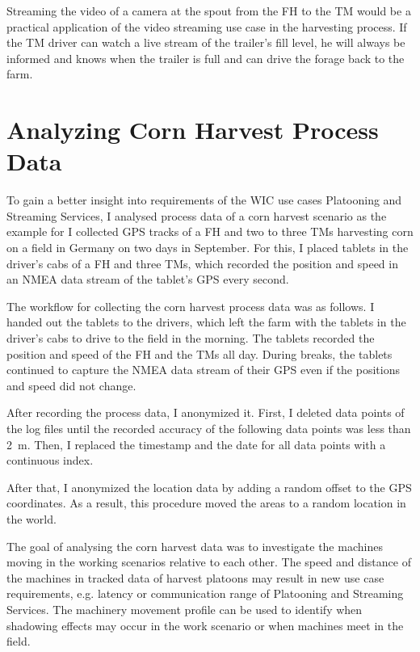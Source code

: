 \documentclass[]{nsm-thesis}
\begin{document}
Streaming the video of a camera at the spout from the \ac{FH} to the \ac{TM} would be a practical application of the video streaming use case in the harvesting process. If the \ac{TM} driver can watch a live stream of the trailer's fill level, he will always be
informed and knows when the trailer is full and can drive the forage back to the
farm.

\chapter{Analyzing Corn Harvest Process Data}

To gain a better insight into requirements of the \ac{WIC} use cases Platooning and Streaming Services, I analysed process data of a corn harvest scenario as the example for I collected GPS tracks of  a  \ac{FH} and two to three \ac{TM}s harvesting corn on a field in Germany on two days in September. For this, I placed tablets in the driver's cabs of  a  \ac{FH} and three \ac{TM}s, which recorded the position and speed in an NMEA data stream of the tablet's GPS every second. 

The workflow for collecting the corn harvest process data was as follows. 
I handed out the tablets to the drivers, which left the farm with the tablets in the driver's cabs to drive to the field in the morning. The tablets recorded the position and speed of the \ac{FH} and the \ac{TM}s all day. During breaks, the tablets continued to capture the NMEA data stream of their GPS even if the positions and speed did not change.

After recording the process data, I anonymized it. 
First, I deleted data points of the log files until the recorded accuracy of the following data points was less than \SI{2}{\metre}. Then, I replaced the timestamp and the date for all data points with a continuous index.

After that, I anonymized the location data by adding a random offset to the GPS coordinates. As a result, this procedure moved the areas to a random location in the world.

The goal of analysing the corn harvest data was to investigate the machines moving in the working scenarios relative to each other. The speed and distance of the machines in tracked data of harvest platoons may result in new use case requirements, e.g. latency or communication range of Platooning and Streaming Services. The machinery movement profile can be used to identify when shadowing effects may occur in the work scenario or when machines meet in the field.
\end{document}
